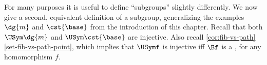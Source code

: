 

For many purposes it is useful to define ``subgroups'' slightly differently.
We now give a second, equivalent definition of a subgroup,
generalizing the examples $\dg{m}$ and $\cst{\base}$ from
the introduction of this chapter. Recall that both
$\USym\dg{m}$ and $\USym\cst{\base}$ are injective.
Also recall \cref{cor:fib-vs-path}\ref{set-fib-vs-path-point},
which implies that $\USymf$ is injective iff $\Bf$ is a \covering,
for any homomorphism $f$.

